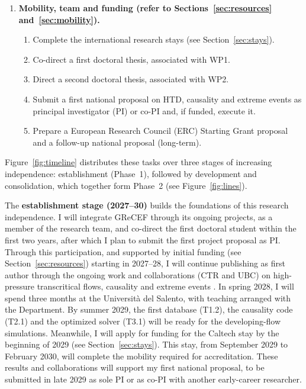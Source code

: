 \documentclass[11pt]{article}
\newcommand{\NEW}[1]{\iffinal #1\else{\color{red}#1}\fi}
\begin{document}
\begin{enumerate}[label=\textbf{WP\arabic*}, leftmargin=*]
\begin{enumerate}[label=T3.\arabic*, leftmargin=*, nosep]
  \end{enumerate}
  \item \textbf{Mobility, team and funding (refer to Sections~\ref{sec:resources} and~\ref{sec:mobility}).}
  \begin{enumerate}[label=T4.\arabic*, leftmargin=*, nosep]
    \item Complete the international research stays (see Section~\ref{sec:stays}).
    \item Co-direct a first doctoral thesis, associated with WP1.
    \item Direct a second doctoral thesis, associated with WP2.
    \item Submit a first national proposal on HTD, causality and extreme events as principal investigator (PI) or co-PI and, if funded, execute it.
    \item Prepare \NEW{a European Research Council (ERC)} Starting Grant proposal and a follow-up national proposal (long-term).
  \end{enumerate}
\end{enumerate}

Figure~\ref{fig:timeline} distributes these tasks over three stages of increasing independence: establishment (Phase~1), followed by development and consolidation, which together form Phase~2 (see Figure~\ref{fig:lines}).

The \textbf{establishment stage (2027--30)} builds the foundations of this research independence. 
I will integrate GReCEF through its ongoing projects, as a member of the research team, and co-direct the first doctoral student within the first two years, after which I plan to submit the first project proposal as PI. 
Through this participation, and supported by initial funding (see Section~\ref{sec:resources}) starting in 2027--28, I will continue publishing as first author through the ongoing work and collaborations (CTR and UBC) on high-pressure transcritical flows, causality and extreme events \NEW{[R1--R3]}. 
In spring 2028, I will spend three months at the Universit\`a del Salento, with teaching arranged with the Department. 
By summer 2029, the first database (T1.2), the causality code (T2.1) and the optimized solver (T3.1) will be ready for the developing-flow simulations. 
Meanwhile, I will apply for funding for the Caltech stay by the beginning of 2029 (see Section~\ref{sec:stays}). 
This stay, from September 2029 to February 2030, will complete the mobility required for accreditation. 
These results and collaborations will support my first national proposal, to be submitted in late 2029 as sole PI or as co-PI with another early-career researcher.
\end{document}
